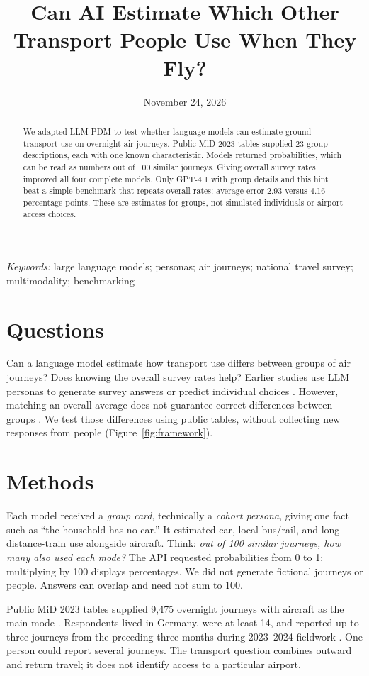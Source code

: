\documentclass{article}
\title{Can AI Estimate Which Other Transport People Use When They Fly?}
\author{}
\date{November 24, 2026}
\begin{document}
\maketitle
\begin{abstract}
We adapted LLM-PDM to test whether language models can estimate ground transport use on overnight air journeys. Public MiD 2023 tables supplied 23 group descriptions, each with one known characteristic. Models returned probabilities, which can be read as numbers out of 100 similar journeys. Giving overall survey rates improved all four complete models. Only GPT-4.1 with group details and this hint beat a simple benchmark that repeats overall rates: average error 2.93 versus 4.16 percentage points. These are estimates for groups, not simulated individuals or airport-access choices.
\end{abstract}
\textit{Keywords:} large language models; personas; air journeys; national travel survey; multimodality; benchmarking

\section{Questions}
Can a language model estimate how transport use differs between groups of air journeys? Does knowing the overall survey rates help? Earlier studies use LLM personas to generate survey answers or predict individual choices \citep{tzachristas2026,mo2026,liu2026}. However, matching an overall average does not guarantee correct differences between groups \citep{bisbee2024}. We test those differences using public tables, without collecting new responses from people (Figure~\ref{fig:framework}).

\section{Methods}
Each model received a \emph{group card}, technically a \emph{cohort persona}, giving one fact such as ``the household has no car.'' It estimated car, local bus/rail, and long-distance-train use alongside aircraft. Think: \emph{out of 100 similar journeys, how many also used each mode?} The API requested probabilities from 0 to 1; multiplying by 100 displays percentages. We did not generate fictional journeys or people. Answers can overlap and need not sum to 100.

Public MiD 2023 tables supplied 9,475 overnight journeys with aircraft as the main mode \citep{mit2023}. Respondents lived in Germany, were at least 14, and reported up to three journeys from the preceding three months during 2023--2024 fieldwork \citep{midmethods2025,midhandbook2025}. One person could report several journeys. The transport question combines outward and return travel; it does not identify access to a particular airport.
\end{document}
